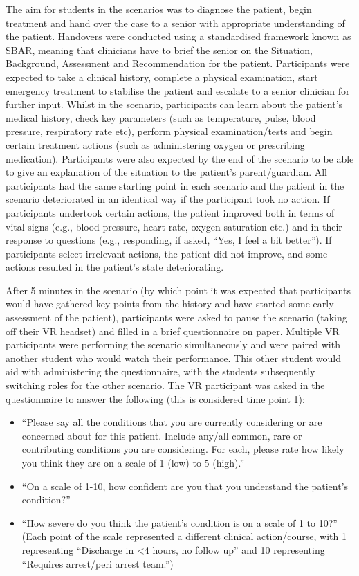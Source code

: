 \documentclass[a4paper, nobind]{templates/ociamthesis}
\providecommand{\tightlist}{%
  \setlength{\itemsep}{0pt}\setlength{\parskip}{0pt}}
\begin{document}
The aim for students in the scenarios was to diagnose the patient, begin treatment and hand over the case to a senior with appropriate understanding of the patient. Handovers were conducted using a standardised framework known as SBAR, meaning that clinicians have to brief the senior on the Situation, Background, Assessment and Recommendation for the patient. Participants were expected to take a clinical history, complete a physical examination, start emergency treatment to stabilise the patient and escalate to a senior clinician for further input. Whilst in the scenario, participants can learn about the patient's medical history, check key parameters (such as temperature, pulse, blood pressure, respiratory rate etc), perform physical examination/tests and begin certain treatment actions (such as administering oxygen or prescribing medication). Participants were also expected by the end of the scenario to be able to give an explanation of the situation to the patient's parent/guardian. All participants had the same starting point in each scenario and the patient in the scenario deteriorated in an identical way if the participant took no action. If participants undertook certain actions, the patient improved both in terms of vital signs (e.g., blood pressure, heart rate, oxygen saturation etc.) and in their response to questions (e.g., responding, if asked, ``Yes, I feel a bit better''). If participants select irrelevant actions, the patient did not improve, and some actions resulted in the patient's state deteriorating.

\hfill\break
After 5 minutes in the scenario (by which point it was expected that participants would have gathered key points from the history and have started some early assessment of the patient), participants were asked to pause the scenario (taking off their VR headset) and filled in a brief questionnaire on paper. Multiple VR participants were performing the scenario simultaneously and were paired with another student who would watch their performance. This other student would aid with administering the questionnaire, with the students subsequently switching roles for the other scenario. The VR participant was asked in the questionnaire to answer the following (this is considered time point 1):

\begin{itemize}
\tightlist
\item
  ``Please say all the conditions that you are currently considering or are concerned about for this patient. Include any/all common, rare or contributing conditions you are considering. For each, please rate how likely you think they are on a scale of 1 (low) to 5 (high).''
\item
  ``On a scale of 1-10, how confident are you that you understand the patient's condition?''
\item
  ``How severe do you think the patient's condition is on a scale of 1 to 10?'' (Each point of the scale represented a different clinical action/course, with 1 representing ``Discharge in \textless4 hours, no follow up'' and 10 representing ``Requires arrest/peri arrest team.'')
\end{itemize}
\end{document}
